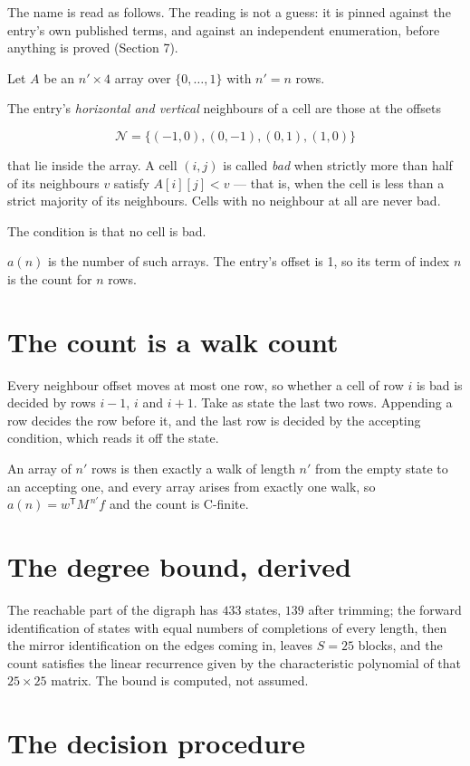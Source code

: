 \documentclass[11pt]{article}
\theoremstyle{definition}
\begin{document}
The name is read as follows. The reading is not a guess: it is pinned against the entry's own published terms, and against an independent enumeration, before anything is proved (Section 7).

Let $A$ be an $n' \times 4$ array over $\{0,\dots,1\}$ with $n' = n$ rows.

The entry's {\itshape horizontal and vertical} neighbours of a cell are those at the offsets

\[\mathcal{N} = \{(-1,0), (0,-1), (0,1), (1,0)\}\]

that lie inside the array. A cell $(i,j)$ is called {\itshape bad} when strictly more than half of its neighbours $v$ satisfy $A[i][j] < v$ --- that is, when the cell is less than a strict majority of its neighbours. Cells with no neighbour at all are never bad.

The condition is that no cell is bad.

$a(n)$ is the number of such arrays. The entry's offset is 1, so its term of index $n$ is the count for $n$ rows.

\section{The count is a walk count}

Every neighbour offset moves at most one row, so whether a cell of row $i$ is bad is decided by rows $i-1$, $i$ and $i+1$. Take as state the last two rows. Appending a row decides the row before it, and the last row is decided by the accepting condition, which reads it off the state.

An array of $n'$ rows is then exactly a walk of length $n'$ from the empty state to an accepting one, and every array arises from exactly one walk, so $a(n) = w^{\mathsf T}M^{\,n'}f$ and the count is C-finite.

\section{The degree bound, derived}

The reachable part of the digraph has $433$ states, $139$ after trimming; the forward identification of states with equal numbers of completions of every length, then the mirror identification on the edges coming in, leaves $S = 25$ blocks, and the count satisfies the linear recurrence given by the characteristic polynomial of that $25\times25$ matrix. The bound is computed, not assumed.

\section{The decision procedure}
\end{document}
